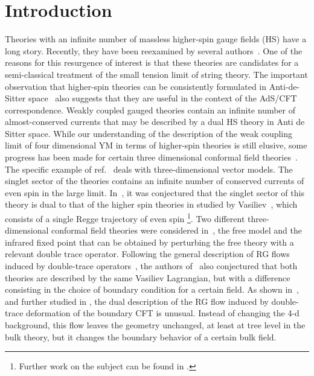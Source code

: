 \documentclass[a4paper,12pt]{article}
\begin{document}
\newpage
\section{Introduction}

Theories with an infinite number of massless higher-spin gauge fields
(HS) have a long story. Recently, they have been reexamined by several
authors~\cite{list}. One of the reasons for this resurgence of
interest is that these theories are candidates for a semi-classical
treatment of the small tension limit of string theory. The important
observation that higher-spin theories can be consistently formulated
in Anti-de-Sitter space~\cite{fv} also suggests that they are useful
in the context of the AdS/CFT correspondence. Weakly coupled gauged
theories contain an infinite number of almost-conserved currents that
may be described by a dual HS theory in Anti de Sitter space.  While
our understanding of the description of the weak coupling limit of
four dimensional YM in terms of higher-spin theories is still elusive,
some progress has been made for certain three dimensional conformal
field theories~\cite{kp}. The specific example of ref.~\cite{kp} deals
with three-dimensional \coordHE{} vector models. The singlet sector of the
\coordHE{} theories contains an infinite number of conserved currents of
even spin in the large \coordHE{} limit. In~\cite{kp}, it was conjectured
that the singlet sector of this theory is dual to that of the higher
spin theories in \coordHE{} studied by Vasiliev~\cite{v}, which consists
of a single Regge trajectory of even spin \footnote{Further work on
the subject can be found in \cite{tedeschi}.}.  Two different
three-dimensional conformal field theories were considered
in~\cite{kp}, the free \coordHE{} model and the infrared fixed point that
can be obtained by perturbing the free theory with a relevant double
trace operator.  Following the general description of RG flows induced
by double-trace operators~\cite{silverstein,wdouble,berkooz}, the
authors of~\cite{kp} also conjectured that both theories are described
by the same Vasiliev Lagrangian, but with a difference consisting in
the choice of boundary condition for a certain field.  As shown
in~\cite{wdouble}, and further studied in \cite{gubser,gk}, the dual
description of the RG flow induced by double-trace deformation of the
boundary CFT is unusual. Instead of changing the 4-d background, this
flow leaves the geometry unchanged, at least at tree level in the bulk
theory, but it changes the boundary behavior of a certain bulk field.
\end{document}
